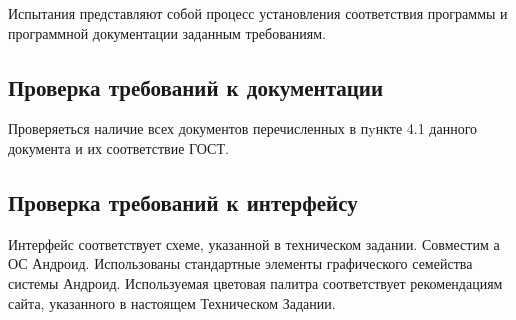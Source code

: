 Испытания представляют собой процесс установления соответствия программы и
программной документации заданным требованиям.

\subsection{Проверка требований к документации}
Проверяеться наличие всех документов перечисленных в пyнкте 4.1 данного документа и их соответствие ГОСТ.

\subsection{Проверка требований к интерфейсу}
Интерфейс соответствует схеме, указанной в техническом задании. Совместим а ОС
Андроид. Использованы стандартные элементы графического семейства системы
Андроид. Используемая цветовая палитра соответствует рекомендациям сайта,
указанного в настоящем Техническом Задании.

